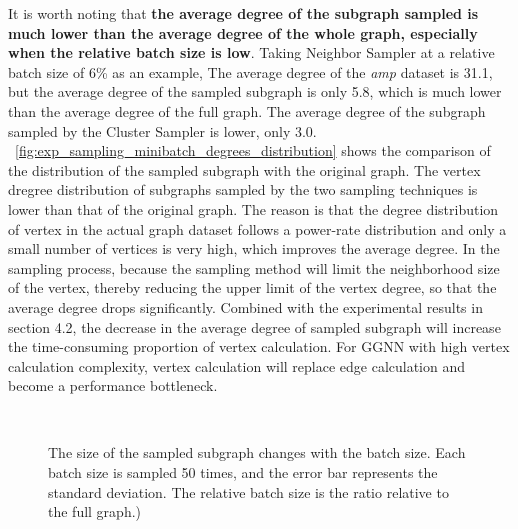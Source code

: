 It is worth noting that \textbf{the average degree of the subgraph sampled is much lower than the average degree of the whole graph,
especially when the relative batch size is low}. Taking Neighbor Sampler at a relative batch size of 6\% as an example,
The average degree of the \textit{amp} dataset is 31.1, but the average degree of the sampled subgraph is only 5.8,
which is much lower than the average degree of the full graph.
The average degree of the subgraph sampled by the Cluster Sampler is lower, only 3.0.
\figurename~\ref{fig:exp_sampling_minibatch_degrees_distribution} shows the comparison of the distribution of the sampled subgraph with the original graph.
The vertex dregree distribution of subgraphs sampled by the two sampling techniques is lower than that of the original graph. 
The reason is that the degree distribution of vertex in the actual graph dataset follows a power-rate distribution and only a small number of vertices is very high,
which improves the average degree. In the sampling process, because the sampling method will limit the neighborhood size of the vertex, thereby reducing the upper limit of the vertex degree,
so that the average degree drops significantly. Combined with the experimental results in section 4.2, the decrease in the average degree of sampled subgraph will increase the time-consuming
proportion of vertex calculation. For GGNN with high vertex calculation complexity, vertex calculation will replace edge calculation and become a performance bottleneck.

\begin{figure}
    \centering
     \\
    \caption{The size of the sampled subgraph changes with the batch size. Each batch size is sampled 50 times, and the error bar represents the standard deviation. The relative batch size is the ratio relative to the full graph.)}
    \label{fig:exp_sampling_minibatch_graph_info}
\end{figure}


